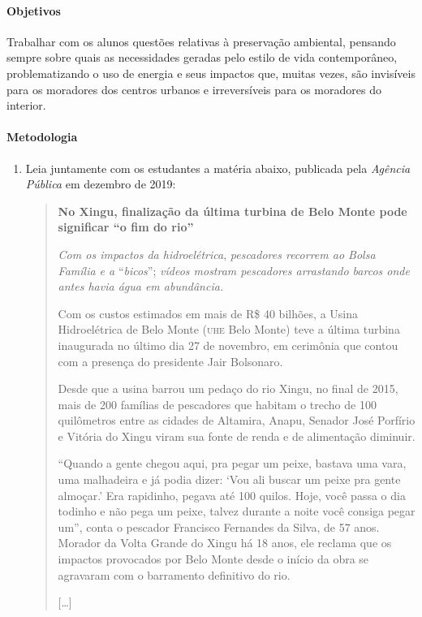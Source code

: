 \documentclass[12pt]{extarticle}
\begin{document}
\paragraph{Objetivos}
Trabalhar com os alunos questões relativas à preservação ambiental,
pensando sempre sobre quais as necessidades geradas pelo estilo de
vida contemporâneo, problematizando o uso de energia e seus impactos
que, muitas vezes, são invisíveis para os moradores dos centros
urbanos e irreversíveis para os moradores do interior.

\paragraph{Metodologia}
  \begin{enumerate}
\item Leia juntamente com os estudantes a matéria abaixo, publicada pela
    \emph{Agência Pública} em dezembro de 2019:

\begin{quote}
\textbf{No Xingu, finalização da última turbina de Belo Monte pode
significar ``o fim do rio''}

\emph{Com os impactos da hidroelétrica}, \emph{pescadores recorrem
ao Bolsa Família e a} ``\emph{bicos}''; \emph{vídeos mostram
pescadores arrastando barcos onde antes havia água em abundância.}

Com os custos estimados em mais de R\$ 40 bilhões, a Usina
Hidroelétrica de Belo Monte (\textsc{uhe} Belo Monte) teve a última turbina
inaugurada no último dia 27 de novembro, em cerimônia que contou com
a presença do presidente Jair Bolsonaro.

Desde que a usina barrou um pedaço do rio Xingu, no final de 2015,
mais de 200 famílias de pescadores que habitam o trecho de 100
quilômetros entre as cidades de Altamira, Anapu, Senador José
Porfírio e Vitória do Xingu viram sua fonte de renda e de
alimentação diminuir.

``Quando a gente chegou aqui, pra pegar um peixe, bastava uma vara,
uma malhadeira e já podia dizer: `Vou ali buscar um peixe pra gente
almoçar.' Era rapidinho, pegava até 100 quilos. Hoje, você passa o
dia todinho e não pega um peixe, talvez durante a noite você consiga
pegar um'', conta o pescador Francisco Fernandes da Silva, de 57
anos. Morador da Volta Grande do Xingu há 18 anos, ele reclama que
os impactos provocados por Belo Monte desde o início da obra se
agravaram com o barramento definitivo do rio.

{[\ldots{}]}


\end{quote}
\end{enumerate}
\end{document}
